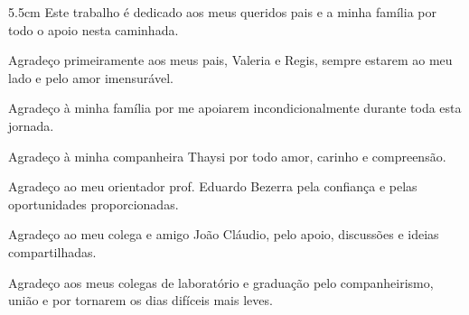 \begin{dedicatoria}
	\vspace*{\fill}
	\noindent
	\begin{adjustwidth*}{}{5.5cm}     
		Este trabalho é dedicado aos meus queridos pais e a minha família por todo o apoio nesta caminhada.
	\end{adjustwidth*}
\end{dedicatoria}

\begin{agradecimentos}
	Agradeço primeiramente aos meus pais, Valeria e Regis, sempre estarem ao meu lado e pelo amor imensurável.
	
	Agradeço à minha família por me apoiarem incondicionalmente durante toda esta jornada.
	
	Agradeço à minha companheira Thaysi por todo amor, carinho e compreensão.

	Agradeço ao meu orientador prof. Eduardo Bezerra pela confiança e pelas oportunidades proporcionadas.
	
	Agradeço ao meu colega e amigo João Cláudio, pelo apoio, discussões e ideias compartilhadas.
	
	Agradeço aos meus colegas de laboratório e graduação pelo companheirismo, união e por tornarem os dias difíceis mais leves.
\end{agradecimentos}

\begin{epigrafe}
	\vspace*{\fill}
	\begin{flushright}
	\end{flushright}
\end{epigrafe}


